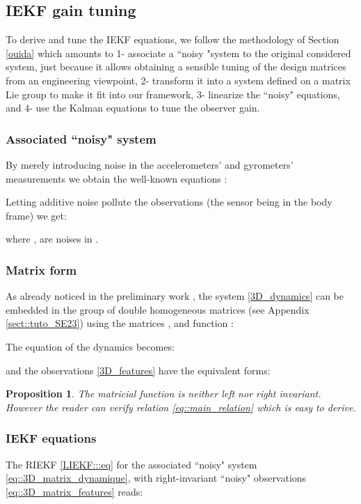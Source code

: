 \documentclass[a4paper,12pt,onecolumn]{article}
\newtheorem{prop}{Proposition}
\begin{document}
\subsection{IEKF gain tuning}
To derive and tune the IEKF equations, we follow the methodology of Section \ref{ouida} which amounts to 1- associate a ``noisy "system to the original considered system, just because it allows obtaining a sensible  tuning of the design matrices from an engineering viewpoint, 2- transform it into a system defined on a matrix Lie group to make it fit into our framework, 3- linearize the ``noisy" equations, and 4- use the Kalman equations to tune the observer gain. 

\subsubsection{Associated ``noisy" system}

By merely introducing noise in the accelerometers' and gyrometers' measurements we obtain the well-known equations \cite{farrell2008aided}:

Letting additive noise pollute the observations (the sensor being in the body frame) we get:

where ,  are noises in .

\subsubsection{Matrix form}
As already noticed in the preliminary work \cite{barrau-bonnabel-cdc14}, the system \eqref{3D_dynamics} can be embedded in the group of double homogeneous matrices (see Appendix \ref{sect::tuto_SE23}) using the matrices ,  and function :


The equation of the dynamics becomes:

and the observations \eqref{3D_features} have the equivalent forms:

\begin{prop}
The matricial function  is neither left nor right invariant. However the reader can verify relation \eqref{eq::main_relation}  which is easy to derive.
\end{prop}






\subsubsection{IEKF equations}
\label{sect::IEKF_eq_3D}
The RIEKF \eqref{LIEKF:::eq} for the associated ``noisy" system
 \eqref{eq::3D_matrix_dynamique}, with right-invariant ``noisy" observations \eqref{eq::3D_matrix_features} reads:
\end{document}

